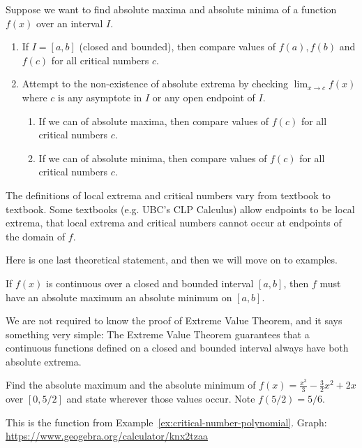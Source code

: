 \documentclass[../main.tex]{subfiles}
\begin{document}
  Suppose we want to find absolute maxima and absolute minima of a function \(f(x)\) over an interval \(I\).
  \begin{enumerate}
    \item If \(I = [a,b]\) (closed and bounded), then compare values of \(f(a), f(b)\) and \(f(c)\) for all critical numbers \(c\).

    \item Attempt to  the non-existence of absolute extrema by checking \(\lim_{x \to c}f(x)\) where \(c\) is any asymptote in \(I\) or any open endpoint of \(I\).
      \begin{enumerate}
        \item If we can  of absolute maxima, then compare values of \(f(c)\) for all critical numbers \(c\).
        \item If we can  of absolute minima, then compare values of \(f(c)\) for all critical numbers \(c\).
      \end{enumerate}
  \end{enumerate}
  \bigskip{}

  \faExclamationTriangle{} The definitions of local extrema and critical numbers vary from textbook to textbook. Some textbooks (e.g. UBC's CLP Calculus) allow endpoints to be local extrema,  that local extrema and critical numbers cannot occur at endpoints of the domain of \(f\).


  \medskip{}
  Here is one last theoretical statement, and then we will move on to examples. 

  \begin{mdframed}[style=withref-compact]
    If \(f(x)\) is continuous over a closed and bounded interval \([a,b]\), then \(f\) must have an absolute maximum  an absolute minimum on \([a,b]\).

  \end{mdframed}
  We are not required to know the proof of Extreme Value Theorem, and it says something very simple: The Extreme Value Theorem guarantees that a continuous functions defined on a closed and bounded interval always have both absolute extrema.
  \clearpage

  \begin{example} \label{ex:closed-interval-method-intro}
    Find the absolute maximum and the absolute minimum of \(f(x) = \frac{x^{3}}{3} - \frac{3}{2}x^{2} + 2x\) over \([0,5/2]\) and state wherever those values occur. Note \(f(5/2) = 5/6\).

    This is the function from Example~\ref{ex:critical-number-polynomial}. Graph: \url{https://www.geogebra.org/calculator/knx2tzaa}

  \end{example}
\end{document}
